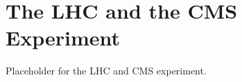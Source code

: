 \chapter{The LHC and the CMS Experiment}
\label{ch:detector}

Placeholder for the LHC and CMS experiment.

